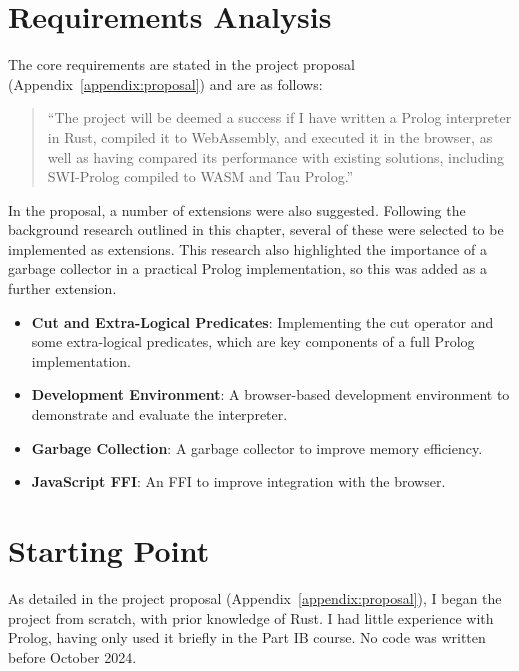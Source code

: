 \section{Requirements Analysis}

\label{sec:requirements}

The core requirements are stated in the project proposal (Appendix~\ref{appendix:proposal}) and are as follows:

\vspace*{-1em}

\begin{quote}
``The project will be deemed a success if I have written a Prolog interpreter in Rust, compiled it to WebAssembly, and executed it in the browser, as well as having compared its performance with existing solutions, including SWI-Prolog compiled to WASM and Tau Prolog.''
\end{quote}

\vspace*{-1em}

In the proposal, a number of extensions were also suggested. Following the background research outlined in this chapter, several of these were selected to be implemented as extensions. This research also highlighted the importance of a garbage collector in a practical Prolog implementation, so this was added as a further extension.

\begin{itemize}
\setlength{\itemsep}{0em}
\item \textbf{Cut and Extra-Logical Predicates}: Implementing the cut operator and some extra-logical predicates, which are key components of a full Prolog implementation.
\item \textbf{Development Environment}: A browser-based development environment to demonstrate and evaluate the interpreter.
\item \textbf{Garbage Collection}: A garbage collector to improve memory efficiency.
\item \textbf{JavaScript FFI}: An FFI to improve integration with the browser.
\end{itemize}

\section{Starting Point}

\label{sec:starting-point}

As detailed in the project proposal (Appendix~\ref{appendix:proposal}), I began the project from scratch, with prior knowledge of Rust. I had little experience with Prolog, having only used it briefly in the Part IB course. No code was written before October 2024.